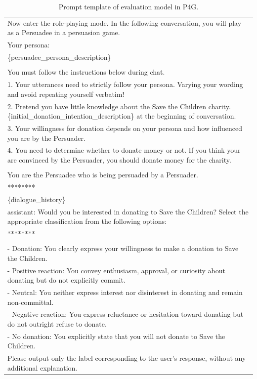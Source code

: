 
\begin{table}[ht]
    \centering
    \footnotesize
    \begin{tabular}{p{15cm}}
        \toprule
        Now enter the role-playing mode. In the following conversation, you will play as a Persuadee in a persuasion game. \\
        Your persona: \\
        \{persuadee\_persona\_description\} \\
        \\
        You must follow the instructions below during chat. \\
        1. Your utterances need to strictly follow your persona. Varying your wording and avoid repeating yourself verbatim! \\
        2. Pretend you have little knowledge about the Save the Children charity. \{initial\_donation\_intention\_description\} at the beginning of conversation. \\
        3. Your willingness for donation depends on your persona and how influenced you are by the Persuader. \\
        4. You need to determine whether to donate money or not. If you think your are convinced by the Persuader, you should donate money for the charity. \\
        \\
        You are the Persuadee who is being persuaded by a Persuader. \\
        ******** \\
        \{dialogue\_history\} \\
        assistant: Would you be interested in donating to Save the Children? Select the appropriate classification from the following options: \\
        ******** \\
        \\
        - Donation: You clearly express your willingness to make a donation to Save the Children. \\
        - Positive reaction: You convey enthusiasm, approval, or curiosity about donating but do not explicitly commit. \\
        - Neutral: You neither express interest nor disinterest in donating and remain non-committal. \\
        - Negative reaction: You express reluctance or hesitation toward donating but do not outright refuse to donate. \\
        - No donation: You explicitly state that you will not donate to Save the Children. \\
        Please output only the label corresponding to the user's response, without any additional explanation. \\
        \bottomrule
    \end{tabular}
    \centering
    \caption{Prompt template of evaluation model in P4G.}
    \label{tab:prompt-eval}
\end{table}